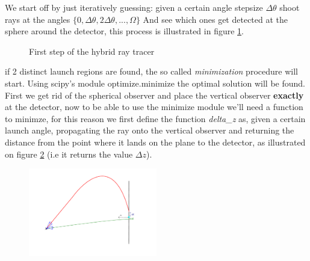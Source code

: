 \documentclass[11pt,a4paper,faculty=we,language=en,doctype=report]{cls/ugent-doc}
\begin{document}
We start off by just iteratively guessing: given a certain angle stepsize
$\Delta \theta$ shoot rays at the angles $\{0,\Delta \theta, 2\Delta
\theta,...,\Omega\}$ And see which ones get detected at the sphere around the
detector, this process is illustrated in figure \ref{figure:First step hybrid}.
\begin{figure}
	\centering
	\caption{First step of the hybrid ray tracer}
	\label{figure:First step hybrid}
\end{figure}
if 2 distinct launch regions are found, the so called \textit{minimization}
procedure will start. Using scipy's module optimize.minimize the optimal
solution will be found. First we get rid of the spherical observer and place
the vertical observer \textbf{exactly} at the detector, now to be able to use the
minimize module we'll need a function to minimze, for this reason we first define the
function \textit{delta\_z} as, given a certain launch angle, propagating the ray
onto the vertical observer and returning the
distance from the point where it lands on the plane to the detector, as
illustrated on figure \ref{fig:PrincipleHybridIllu} (i.e it returns the value $\Delta z$).
\begin{figure}[h!]
  \centering
  \includegraphics[width=0.5\textwidth]{PrincipleHybridIllu.pdf}
  \label{fig:PrincipleHybridIllu}
\end{figure}
\end{document}
